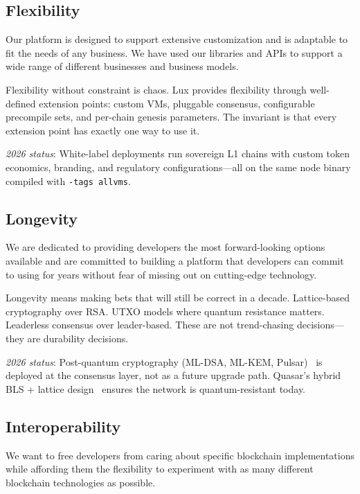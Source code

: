 \documentclass[11pt,a4paper]{article}
\begin{document}
\subsection{Flexibility}

Our platform is designed to support extensive customization and is
adaptable to fit the needs of any business. We have used our libraries
and APIs to support a wide range of different businesses and business
models.

Flexibility without constraint is chaos. Lux provides flexibility
through well-defined extension points: custom VMs, pluggable consensus,
configurable precompile sets, and per-chain genesis parameters. The
invariant is that every extension point has exactly one way to use it.

\medskip\noindent\textit{2026 status}: White-label deployments
run sovereign L1 chains with custom token economics, branding, and
regulatory configurations---all on the same node binary compiled with
\texttt{-tags allvms}.

\subsection{Longevity}

We are dedicated to providing developers the most forward-looking
options available and are committed to building a platform that
developers can commit to using for years without fear of missing out
on cutting-edge technology.

Longevity means making bets that will still be correct in a decade.
Lattice-based cryptography over RSA. UTXO models where quantum
resistance matters. Leaderless consensus over leader-based. These are
not trend-chasing decisions---they are durability decisions.

\medskip\noindent\textit{2026 status}: Post-quantum cryptography
(ML-DSA, ML-KEM, Pulsar)~\cite{lp305} is deployed at the consensus layer, not
as a future upgrade path. Quasar's hybrid BLS + lattice design~\cite{lp105,lp307}
ensures the network is quantum-resistant today.

\subsection{Interoperability}

We want to free developers from caring about specific blockchain
implementations while affording them the flexibility to experiment
with as many different blockchain technologies as possible.
\end{document}
